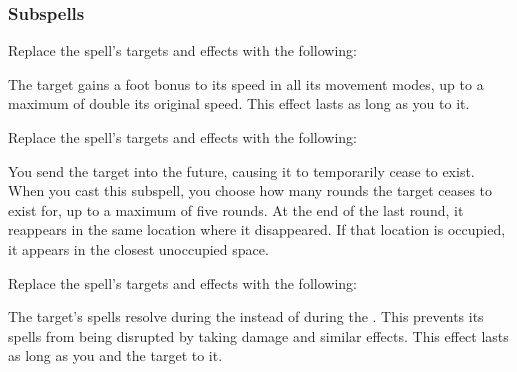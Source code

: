 \subsubsection{Subspells}
Replace the spell's targets and effects with the following:
\begin{spellcontent}
\begin{augmenttargetinginfo}
\end{augmenttargetinginfo}
\begin{augmenteffects}
\spelleffect
The target gains a  foot bonus to its speed in all its movement modes, up to a maximum of double its original speed.
This effect lasts as long as you  to it.
\end{augmenteffects}
\end{spellcontent}
Replace the spell's targets and effects with the following:
\begin{spellcontent}
\begin{augmenttargetinginfo}
\end{augmenttargetinginfo}
\begin{augmenteffects}
\spelleffect
You send the target into the future, causing it to temporarily cease to exist.
When you cast this subspell, you choose how many rounds the target ceases to exist for, up to a maximum of five rounds.
At the end of the last round, it reappears in the same location where it disappeared.
If that location is occupied, it appears in the closest unoccupied space.
\end{augmenteffects}
\end{spellcontent}
Replace the spell's targets and effects with the following:
\begin{spellcontent}
\begin{augmenttargetinginfo}
\end{augmenttargetinginfo}
\begin{augmenteffects}
\spelleffect
The target's spells resolve during the  instead of during the .
This prevents its spells from being disrupted by taking damage and similar effects.
This effect lasts as long as you and the target  to it.
\end{augmenteffects}
\end{spellcontent}
